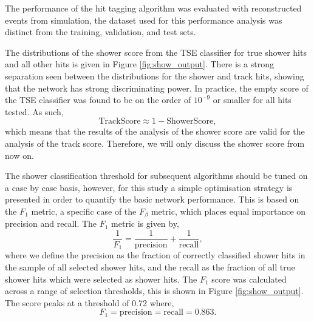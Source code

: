 The performance of the hit tagging algorithm was evaluated with reconstructed
events from \protodune{} simulation, the dataset used for this performance
analysis was distinct from the training, validation, and test sets. 

The distributions of the shower score from the TSE classifier for true shower 
hits and all other hits is given in Figure \ref{fig:show_output}. There is a 
strong separation seen between the distributions for the shower and track 
hits, showing that the network has strong discriminating power. In practice, the
empty score of the TSE classifier was found to be on the order of $10^{-9}$ or
smaller for all hits tested. As such,
\begin{equation*}
	\mbox{TrackScore} \approx 1 - \mbox{ShowerScore},
\end{equation*}
which means that the results of the analysis of the shower score are valid for
the analysis of the track score. Therefore, we will only discuss the shower
score from now on.

The shower classification threshold for subsequent algorithms should be tuned on
a case by case basis, however, for this study a simple optimisation strategy 
is presented in order to quantify the basic network performance. This is based
on the $F_1$ metric, a specific case of the $F_\beta$ 
metric\cite{VanRijsbergenC.J.1975Ir}, which places equal importance on 
precision and recall. The $F_1$ metric is given by, 
\begin{equation*}
	\frac{1}{F_1} = \frac{1}{\mbox{precision}} + \frac{1}{\mbox{recall}},
\end{equation*}
where we define the precision as the fraction of correctly classified shower 
hits in the sample of all selected shower hits, and the recall as the fraction 
of all true shower hits which were selected as shower hits. The $F_1$ score 
was calculated across a range of selection thresholds, this is shown in Figure 
\ref{fig:show_output}. The score peaks at a threshold of 0.72 where,
\begin{equation*}
	F_1 = \mbox{precision} = \mbox{recall} = 0.863.
\end{equation*}


